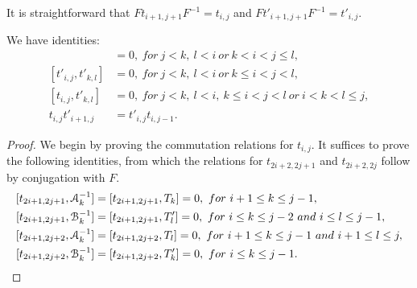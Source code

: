 \documentclass{amsart}
\begin{document}
It is straightforward that $Ft_{i+1,j+1}F^{-1}=t_{i,j}$ and $Ft'_{i+1,j+1}F^{-1}=t'_{i,j}$.
\begin{prop}\label{prop:t_comm_rels}
We have identities:
\begin{align}
[t_{i,j},t_{k,l}]&=0,\  for\ j<k,\  l<i\ or\  k<i<j\leq l,\\
[t'_{i,j},t'_{k,l}]&=0,\  for\ j<k,\  l<i\ or\  k\leq i<j<l,\\
[t_{i,j},t'_{k,l}]&=0,\  for\ j<k,\  l<i,\  k\leq i<j<l\ or\  i<k<l\leq j,\\
t_{i,j}t'_{i+1,j}&=t'_{i,j}t_{i,j-1}\label{eq:tt'_rels}.   
\end{align}
\end{prop}
\begin{proof}
We begin by proving the commutation relations for $t_{i,j}$. It suffices to prove the following identities, from which the relations for $t_{2i+2,2j+1}$ and $t_{2i+2,2j}$ follow by conjugation with $F$.  
\[
\begin{aligned}
[t_{2i+1,2j+1},\AA^{-1}_k]&=[t_{2i+1,2j+1},T_{k}]=0,\ for\ i+1\leq k\leq j-1,\\
[t_{2i+1,2j+1},\BB^{-1}_k]&=[t_{2i+1,2j+1},T'_l]=0,\ for\ i\leq k\leq j-2\ and\ i\leq l\leq j-1,\\
[t_{2i+1,2j+2},\AA^{-1}_k]&=[t_{2i+1,2j+2},T_{l}]=0,\ for\ i+1\leq k\leq j-1\ and\ i+1\leq l\leq j,\\
[t_{2i+1,2j+2},\BB^{-1}_k]&=[t_{2i+1,2j+2},T'_k]=0,\ for\ i\leq k\leq j-1.
\end{aligned}
\]


\end{proof}
\end{document}
